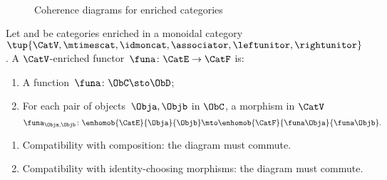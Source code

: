\begin{figure*}[h!]
    \\
    \caption{Coherence diagrams for enriched categories}
    \label{fig:diagrams-enriched-category}
\end{figure*}

\begin{ctdefinition}
    \label{def:enrichedfunctor}

    Let \CatE and \CatF be categories enriched in a monoidal category $\tup{\CatV, \mtimescat, \idmoncat, \associator, \leftunitor, \rightunitor}$.
    A $\CatV$-enriched functor~$\funa\colon \CatE \to \CatF$ is:

    \constit
    \begin{enumerate}
        \item A function~$\funa\colon \ObC \sto \ObD$;
        \item For each pair of objects~$\Obja, \Objb$ in $\ObC$, a morphism in $\CatV$
              \begin{equation}
                  \funa_{\Obja, \Objb} \colon \enhomob{\CatE}{\Obja}{\Objb} \mto \enhomob{\CatF}{\funa \Obja}{\funa \Objb}.
              \end{equation}
    \end{enumerate}

    \condit
    \begin{enumerate}
        \item Compatibility with composition: the diagram
              must commute.
        \item Compatibility with identity-choosing morphisms: the diagram
              must commute.
    \end{enumerate}
\end{ctdefinition}

